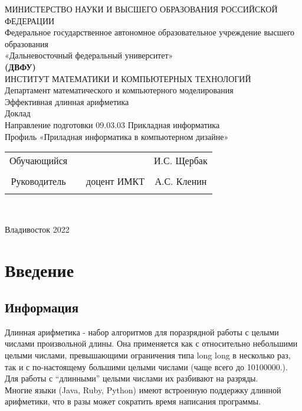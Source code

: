 \documentclass[a4paper]{article}
\begin{document}
 
 
\begin{center}
\hfill \break
\large{МИНИСТЕРСТВО НАУКИ И ВЫСШЕГО ОБРАЗОВАНИЯ РОССИЙСКОЙ ФЕДЕРАЦИИ}\\
\footnotesize{Федеральное государственное автономное образовательное учреждение высшего образования}\\ 
\footnotesize{«Дальневосточный федеральный университет»}\\
\small{\textbf{(ДВФУ)}}\\
\hfill \break
\normalsize{ИНСТИТУТ МАТЕМАТИКИ И КОМПЬЮТЕРНЫХ ТЕХНОЛОГИЙ}\\
 \hfill \break
\normalsize{Департамент математического и компьютерного моделирования}\\
\hfill\break
\hfill \break
\hfill \break
\hfill \break
\large{Эффективная длинная арифметика}\\
\hfill \break
\hfill \break
\hfill \break
\normalsize{Доклад\\
\hfill \break
Направление подготовки 09.03.03 Прикладная информатика\\
\hfill \break
Профиль «Приладная информатика в компьютерном дизайне»}\\
\hfill \break
\hfill \break
\end{center}
 
\normalsize{} \hfill \break
\hfill \break
 
\normalsize{ 
\begin{tabular}{cccc}
Обучающийся & \underline{\hspace{3cm}} & &И.С. Щербак \\\\
Руководитель & \underline{\hspace{3cm}}& доцент ИМКТ &А.С. Кленин \\\\
\end{tabular}
}\\
\hfill \break
\hfill \break
\begin{center} Владивосток 2022 \end{center}
\thispagestyle{empty} 
 
\newpage
     
    \tableofcontents 
\newpage

\section{Введение}
\subsection{Информация}
Длинная арифметика - набор алгоритмов для поразрядной работы с целыми числами произвольной длины. Она применяется как с относительно небольшими целыми числами, превышающими ограничения типа long long в несколько раз, так и с по-настоящему большими целыми числами (чаще всего до 10100000.). Для работы с “длинными” целыми числами их разбивают на разряды.
\\Многие языки (Java, Ruby, Python) имеют встроенную поддержку длинной арифметики, что в разы может сократить время написания программы.
\end{document}
